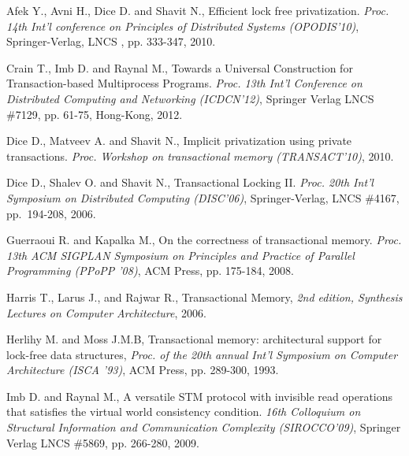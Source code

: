 \documentclass[11pt,letterpaper]{article}
\begin{document}
%
%


{\small 

\begin{thebibliography}{guerraoui08}


 Afek Y.,  Avni H.,   Dice D. and  Shavit N.,
Efficient lock free privatization. 
{\it Proc.  14th Int'l conference on Principles of Distributed Systems 
(OPODIS'10)}, Springer-Verlag,  LNCS , pp. 333-347, 2010. 



Crain T., Imb D. and Raynal M., 
Towards a Universal Construction for Transaction-based Multiprocess Programs.
{\it Proc. 13th Int'l Conference on Distributed Computing and Networking
(ICDCN'12)}, 
Springer Verlag LNCS \#7129, pp. 61-75, Hong-Kong,  2012. 



Dice D., Matveev A. and  Shavit N.,
 Implicit privatization using private transactions. 
{\it Proc. Workshop on transactional memory (TRANSACT'10)}, 2010.




Dice D., Shalev O. and Shavit N.,
Transactional Locking II.
{\em Proc. 20th Int'l Symposium on Distributed Computing (DISC'06)},
Springer-Verlag, LNCS \#4167, pp.~194-208, 2006.


Guerraoui R. and  Kapalka M.,  
 On the correctness of transactional memory. 
{\it  Proc. 13th ACM SIGPLAN Symposium on Principles and Practice of 
Parallel Programming (PPoPP '08)},  ACM Press, pp.  175-184, 2008.




 Harris T.,  Larus J., and  Rajwar R., 
Transactional Memory, 
{\it 2nd edition, Synthesis Lectures on Computer Architecture},  2006.




Herlihy M.  and Moss J.M.B,
 Transactional memory: architectural support for lock-free data structures, 
{\it Proc.  of the 20th annual Int'l Symposium on Computer Architecture 
(ISCA '93)}, ACM Press, pp. 289-300, 1993. 



Imb D. and Raynal M., 
A versatile   STM protocol with invisible read operations 
that satisfies  the  virtual world consistency condition.
{\it   16th  Colloquium   on  Structural   Information   and  Communication
Complexity  (SIROCCO'09)}, 
Springer Verlag LNCS   \#5869, pp. 266-280,  2009.



\end{thebibliography}}
\end{document}
